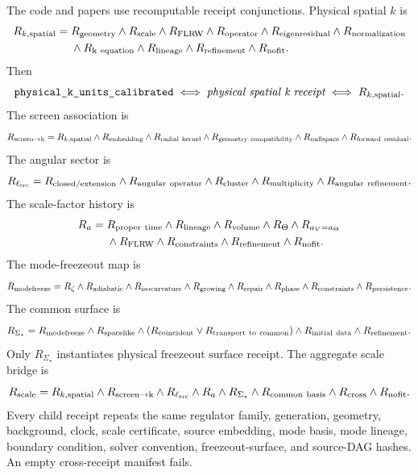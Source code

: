 \begin{target}\label{target:physical-scale-receipts}
The code and papers use recomputable receipt conjunctions.  Physical spatial \(k\) is
\[
\begin{aligned}
R_{k,\rm spatial}={}&
R_{\rm geometry}\wedge R_{\rm scale}\wedge R_{\rm FLRW}\wedge
R_{\rm operator}\wedge R_{\rm eigenresidual}\wedge R_{\rm normalization}\\
&\wedge R_{\rm k\ equation}\wedge R_{\rm lineage}\wedge
R_{\rm refinement}\wedge R_{\rm nofit}.
\end{aligned}
\]
Then
\[
\texttt{physical\_k\_units\_calibrated}
\iff
\emph{physical spatial k receipt}
\iff
R_{k,\rm spatial}.
\]
The screen association is
\[
R_{\rm screen\to k}
=
R_{k,\rm spatial}\wedge R_{\rm embedding}\wedge R_{\rm radial\ kernel}
\wedge R_{\rm geometry\ compatibility}\wedge R_{\rm nullspace}
\wedge R_{\rm forward\ residual}.
\]
The angular sector is
\[
R_{\ell_{\rm src}}=
R_{\rm closed/extension}\wedge R_{\rm angular\ operator}\wedge
R_{\rm cluster}\wedge R_{\rm multiplicity}\wedge R_{\rm angular\ refinement}.
\]
The scale-factor history is
\[
\begin{aligned}
R_a={}&
R_{\rm proper\ time}\wedge R_{\rm lineage}\wedge R_{\rm volume}
\wedge R_{\Theta}\wedge R_{a_V=a_\Theta}\\
&\wedge R_{\rm FLRW}\wedge R_{\rm constraints}\wedge
R_{\rm refinement}\wedge R_{\rm nofit}.
\end{aligned}
\]
The mode-freezeout map is
\[
R_{\rm modefreeze}=
R_{\zeta}\wedge R_{\rm adiabatic}\wedge R_{\rm isocurvature}
\wedge R_{\rm growing}\wedge R_{\rm repair}\wedge R_{\rm phase}
\wedge R_{\rm constraints}\wedge R_{\rm persistence}.
\]
The common surface is
\[
R_{\Sigma_\star}=
R_{\rm modefreeze}\wedge R_{\rm spacelike}
\wedge (R_{\rm coincident}\vee R_{\rm transport\ to\ common})
\wedge R_{\rm initial\ data}\wedge R_{\rm refinement}.
\]
Only \(R_{\Sigma_\star}\) instantiates
\(\text{physical freezeout surface receipt}\).  The aggregate scale bridge is
\[
R_{\rm scale}=R_{k,\rm spatial}\wedge R_{\rm screen\to k}\wedge
R_{\ell_{\rm src}}\wedge R_a\wedge R_{\Sigma_\star}\wedge
R_{\rm common\ basis}\wedge R_{\rm cross}\wedge R_{\rm nofit}.
\]
Every child receipt repeats the same regulator family, generation, geometry, background, clock,
scale certificate, source embedding, mode basis, mode lineage, boundary condition, solver
convention, freezeout-surface, and source-DAG hashes.  An empty cross-receipt manifest fails.
\end{target}


